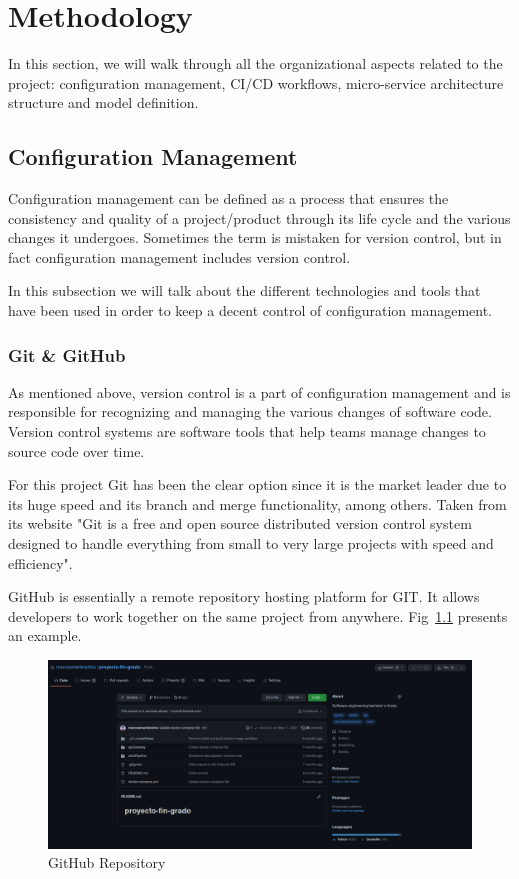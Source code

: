 \chapter{Methodology}
\label{mt:methodology}

In this section, we will walk through all the organizational aspects related to the project: configuration management, CI/CD workflows, micro-service architecture structure and model definition.

\section{Configuration Management}

Configuration management can be defined as a process that ensures the consistency and quality of a project/product through its life cycle and the various changes it undergoes. Sometimes the term is mistaken for version control, but in fact configuration management includes version control.

In this subsection we will talk about the different technologies and tools that have been used in order to keep a decent control of configuration management.

\subsection{Git \& GitHub}

As mentioned above, version control is a part of configuration management and is responsible for recognizing and managing the various changes of software code. Version control systems are software tools that help teams manage changes to source code over time. 

For this project Git has been the clear option since it is the market leader due to its huge speed and its branch and merge functionality, among others. Taken from its website "Git is a free and open source distributed version control system designed to handle everything from small to very large projects with speed and efficiency".~\cite{gitDefinition}

GitHub is essentially a remote repository hosting platform for GIT. It allows developers to work together on the same project from anywhere. Fig~\ref{fig:current-status-github} presents an example.

\begin{figure}[H]
    \centering
    \includegraphics[width=\textwidth]{figures/github.png}
    \caption{GitHub Repository}
    \label{fig:current-status-github}
\end{figure}

